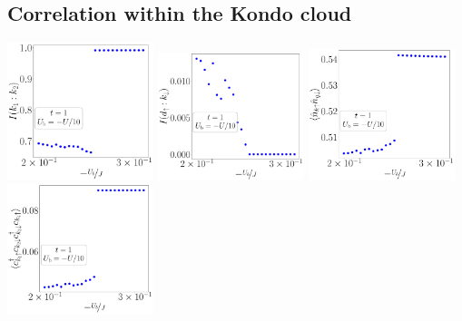 \documentclass{report}
\numberwithin{equation}{section}
\begin{document}
\subsection*{Correlation within the Kondo cloud}
\begin{center}
	\includegraphics[width=0.32\textwidth]{../figures/corr-k-D=1000.00000,t=1.00000,J=30.00000,V=1.50000J,Ub=-Uby10,N=4,U=59.85787,93.55363,25.pdf}
	\includegraphics[width=0.32\textwidth]{../figures/mi-dk-D=1000.00000,t=1.00000,J=30.00000,V=1.50000J,Ub=-Uby10,N=4,U=59.85787,93.55363,25.pdf}
	\includegraphics[width=0.32\textwidth]{../figures/corr-k-diag-D=1000.00000,t=1.00000,J=30.00000,V=1.50000J,Ub=-Uby10,N=4,U=59.85787,93.55363,25.pdf}
	\includegraphics[width=0.32\textwidth]{../figures/corr-k-od-D=1000.00000,t=1.00000,J=30.00000,V=1.50000J,Ub=-Uby10,N=4,U=59.85787,93.55363,25.pdf}
\end{center}
\end{document}
